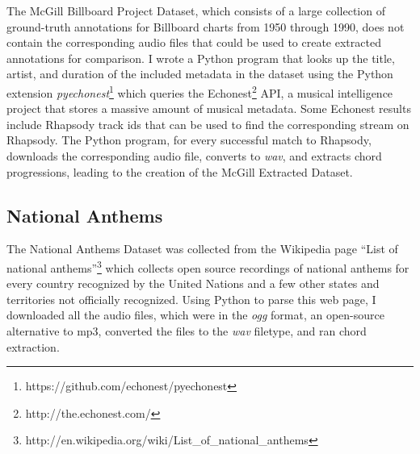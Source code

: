 The McGill Billboard Project Dataset\cite{BurgoyneEtAl_2011_AnExpeGrouSet}, which consists of a large collection of ground-truth annotations for Billboard charts from 1950 through 1990, does not contain the corresponding audio files that could be used to create extracted annotations for comparison. I wrote a Python program that looks up the title, artist, and duration of the included metadata in the dataset using the Python extension \textit{pyechonest}\footnote{https://github.com/echonest/pyechonest} which queries the Echonest\footnote{http://the.echonest.com/} API, a musical intelligence project that stores a massive amount of musical metadata. Some Echonest results include Rhapsody track ids that can be used to find the corresponding stream on Rhapsody. The Python program, for every successful match to Rhapsody, downloads the corresponding audio file, converts to \textit{wav}, and extracts chord progressions, leading to the creation of the McGill Extracted Dataset.

\subsection{National Anthems}

The National Anthems Dataset was collected from the Wikipedia page ``List of national anthems''\footnote{http://en.wikipedia.org/wiki/List\_of\_national\_anthems} which collects open source recordings of national anthems for every country recognized by the United Nations and a few other states and territories not officially recognized. Using Python to parse this web page, I downloaded all the audio files, which were in the \textit{ogg} format, an open-source alternative to mp3, converted the files to the \textit{wav} filetype, and ran chord extraction.